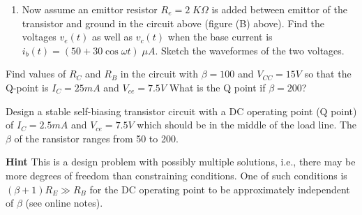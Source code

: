 \begin{enumerate}
\item Now assume an emittor resistor $R_e=2\;K\Omega$ is added between 
emittor of the transistor and ground in the circuit above (figure (B)
above).  Find the voltages $v_e(t)$ as well as $v_c(t)$ when the base
current is $i_b(t)=(50+30 \cos \omega t)\;\mu A$. Sketch the waveformes
of the two voltages.


\end{enumerate}





\item Find values of $R_C$ and $R_B$ in the circuit with $\beta=100$
and $V_{CC}=15V$ so that the Q-point is $I_C=25mA$ and $V_{ce}=7.5V$
What is the Q point if $\beta=200$?




% 

\item Design a stable self-biasing transistor circuit with a DC operating
point (Q point) of $I_C=2.5mA$ and $V_{ce}=7.5V$ which should be in the 
middle of the load line. The $\beta$ of the ransistor ranges from 50 to
200. 

{\bf Hint} This is a design problem with possibly multiple solutions, 
i.e., there may be more degrees of freedom than constraining conditions. 
One of such conditions is $(\beta+1)R_E \gg R_B$ for the DC operating 
point to be approximately independent of $\beta$ (see online notes). 


